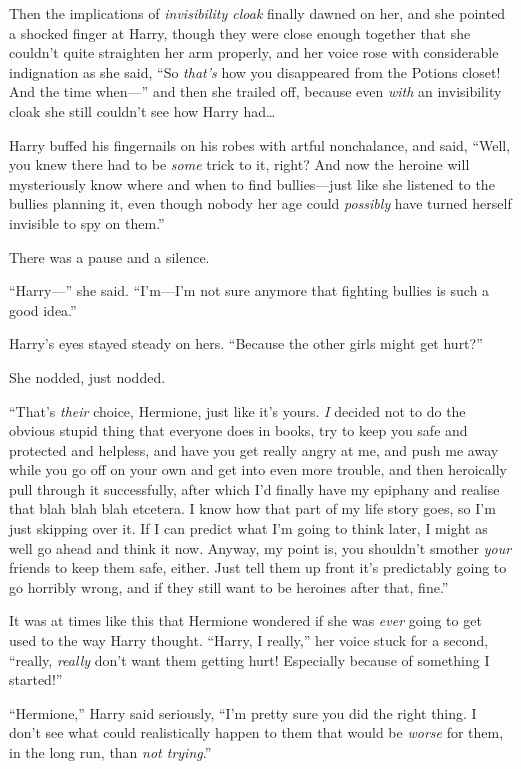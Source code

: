 Then the implications of \emph{invisibility cloak} finally dawned on
her, and she pointed a shocked finger at Harry, though they were close
enough together that she couldn't quite straighten her arm properly, and
her voice rose with considerable indignation as she said, ``So
\emph{that's} how you disappeared from the Potions closet! And the time
when---'' and then she trailed off, because even \emph{with} an
invisibility cloak she still couldn't see how Harry had\ldots{}

Harry buffed his fingernails on his robes with artful nonchalance, and
said, ``Well, you knew there had to be \emph{some} trick to it, right?
And now the heroine will mysteriously know where and when to find
bullies---just like she listened to the bullies planning it, even though
nobody her age could \emph{possibly} have turned herself invisible to
spy on them.''

There was a pause and a silence.

``Harry---'' she said. ``I'm---I'm not sure anymore that fighting
bullies is such a good idea.''

Harry's eyes stayed steady on hers. ``Because the other girls might get
hurt?''

She nodded, just nodded.

``That's \emph{their} choice, Hermione, just like it's yours. \emph{I}
decided not to do the obvious stupid thing that everyone does in books,
try to keep you safe and protected and helpless, and have you get really
angry at me, and push me away while you go off on your own and get into
even more trouble, and then heroically pull through it successfully,
after which I'd finally have my epiphany and realise that blah blah blah
etcetera. I know how that part of my life story goes, so I'm just
skipping over it. If I can predict what I'm going to think later, I
might as well go ahead and think it now. Anyway, my point is, you
shouldn't smother \emph{your} friends to keep them safe, either. Just
tell them up front it's predictably going to go horribly wrong, and if
they still want to be heroines after that, fine.''

It was at times like this that Hermione wondered if she was \emph{ever}
going to get used to the way Harry thought. ``Harry, I really,'' her
voice stuck for a second, ``really, \emph{really} don't want them
getting hurt! Especially because of something I started!''

``Hermione,'' Harry said seriously, ``I'm pretty sure you did the right
thing. I don't see what could realistically happen to them that would be
\emph{worse} for them, in the long run, than \emph{not trying}.''

